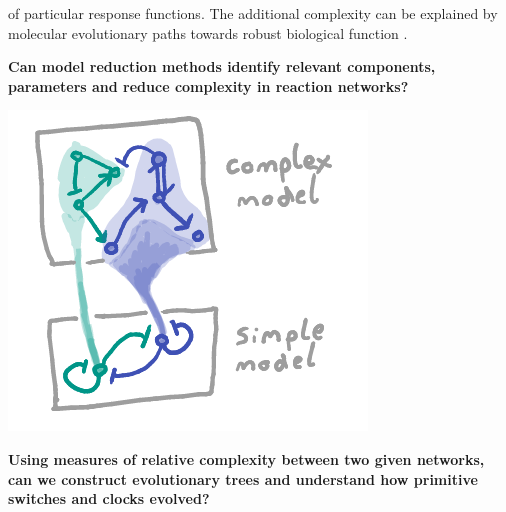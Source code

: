 \documentclass[a0,portrait]{a0poster}
\begin{document}
\begin{multicols}{3}
of particular response functions. The additional complexity can be
explained by molecular evolutionary paths towards robust biological function
\cite{}.
\\
\begin{tcolorbox}[boxrule=2pt,arc=3.4pt,boxsep=2mm]
\begin{center}\color{DarkRed}
\textbf{Can model reduction methods \cite{} identify relevant components,
parameters \cite{} and reduce complexity in reaction networks?}
\end{center}
\end{tcolorbox}
\begin{center}
\includegraphics[width=0.9\linewidth]{reduction}
\end{center}
\begin{tcolorbox}[boxrule=2pt,arc=3.4pt,boxsep=2mm]
\begin{center}\color{DarkRed}
\textbf{Using measures of relative complexity between two given networks,
can we construct evolutionary trees and understand how primitive switches
and clocks evolved?}
\end{center}
\end{tcolorbox}
\vfill\null
\columnbreak

\end{multicols}
\end{document}
